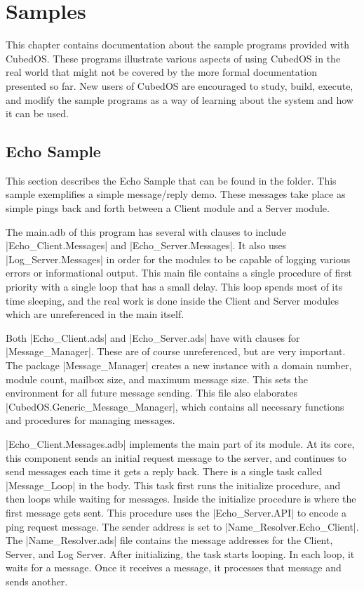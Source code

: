 
\section{Samples}
\label{sec:manual-samples}

This chapter contains documentation about the sample programs provided with Cubed\-OS. These
programs illustrate various aspects of using CubedOS in the real world that might not be
covered by the more formal documentation presented so far. New users of CubedOS are encouraged to
study, build, execute, and modify the sample programs as a way of learning about the system and
how it can be used.

\subsection{Echo Sample}
\label{sec:manual-echo-sample}

This section describes the Echo Sample that can be found in the  folder.
This sample exemplifies a simple message/reply demo. These messages take place as simple pings
back and forth between a Client module and a Server module. 

The main.adb of this program has several with clauses to include |Echo_Client.Messages| and
|Echo_Server.Messages|. It also uses |Log_Server.Messages| in order for the modules to be
capable of logging various errors or informational output. This main file contains a single
procedure of first priority with a single loop that has a small delay. This loop spends most of
its time sleeping, and the real work is done inside the Client and Server modules which are
unreferenced in the main itself. 

Both |Echo_Client.ads| and |Echo_Server.ads| have with clauses for |Message_Manager|. These are
of course unreferenced, but are very important. The package |Message_Manager| creates a new
instance with a domain number, module count, mailbox size, and maximum message size. This sets
the environment for all future message sending. This file also elaborates
|CubedOS.Generic_Message_Manager|, which contains all necessary functions and procedures for
managing messages. 

|Echo_Client.Messages.adb| implements the main part of its module. At its core, this component
sends an initial request message to the server, and continues to send messages each time it gets
a reply back. There is a single task called |Message_Loop| in the body. This task first runs the
initialize procedure, and then loops while waiting for messages. Inside the initialize procedure
is where the first message gets sent. This procedure uses the |Echo_Server.API| to encode a ping
request message. The sender address is set to |Name_Resolver.Echo_Client|. The
|Name_Resolver.ads| file contains the message addresses for the Client, Server, and Log Server.
After initializing, the task starts looping. In each loop, it waits for a message. Once it
receives a message, it processes that message and sends another.

